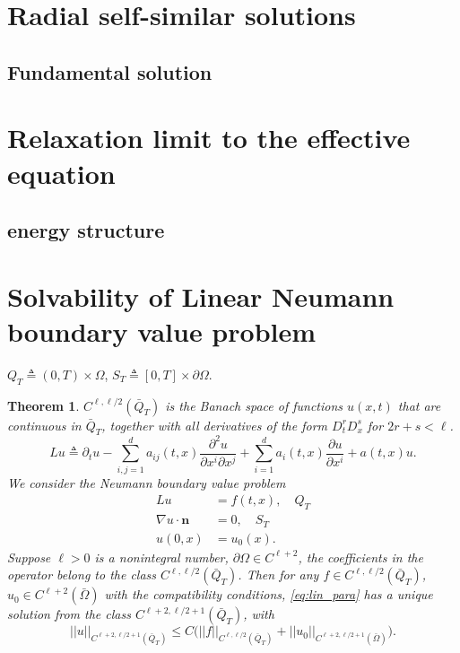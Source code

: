 \documentclass[a4paper,11pt]{article}
\def\blue{\color{blue}}
\newtheorem{theorem}{Theorem}
\theoremstyle{remark}
\begin{document}
\section{Radial self-similar solutions}
\subsection{Fundamental solution}

\section{Relaxation limit to the effective equation}
\subsection{energy structure}

\appendix
\section{Solvability of Linear Neumann boundary value problem}
$Q_T\triangleq (0,T)\times\Omega$, $S_T\triangleq [0,T]\times\partial\Omega$.

\begin{theorem}
 $C^{\ell,\ell/2}(\bar{Q}_T)$ is the Banach space of functions $u(x,t)$ that are continuous in $\bar{Q}_T$, together with all derivatives of the form $D^r_t D^s_x$ for $2r+s<\ell$.
 \begin{equation}
  Lu\triangleq \partial_t u - \sum_{i,j=1}^d a_{ij}(t,x) \frac{\partial^2 u}{\partial x^i \partial x^j} + \sum_{i=1}^d a_i(t,x) \frac{\partial u}{\partial x^i} + a(t,x) u.
 \end{equation}
 We consider the Neumann boundary value problem
 \begin{equation} \label{eq:lin_para}
  \begin{aligned}
   Lu &= f(t,x), \quad Q_T\\
   \nabla u\cdot \mathbf{n} &= 0, \quad S_T\\
   u(0,x) &= u_0(x).
  \end{aligned}
 \end{equation}
 Suppose $\ell>0$ is a nonintegral number, $\partial\Omega \in C^{\ell+2}$, the coefficients in the operator belong to the class $C^{\ell,\ell/2}(\bar{Q}_T)$. Then for any $f \in C^{\ell,\ell/2}(\bar{Q}_T)$, $u_0\in C^{\ell+2}(\bar\Omega)$ with the {\blue compatibility conditions}, \eqref{eq:lin_para} has a unique solution from the class $C^{\ell+2,\ell/2+1}(\bar{Q}_T)$, with
 \begin{equation}
  ||u||_{C^{\ell+2,\ell/2+1}(\bar{Q}_T)} \le C\Big( ||f||_{C^{\ell,\ell/2}(\bar{Q}_T)} + ||u_0||_{C^{\ell+2,\ell/2+1}(\bar\Omega)}\Big). \label{regularity}
 \end{equation}
\end{theorem}
\end{document}
